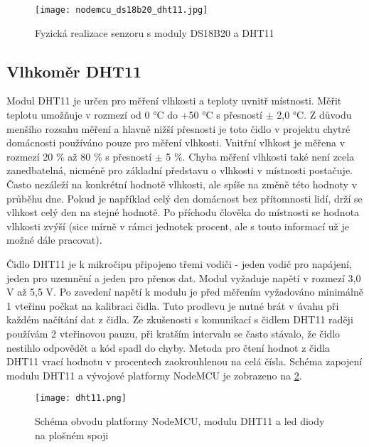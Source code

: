 \begin{figure}[H]
  \centering
  \texttt{[image: nodemcu\_ds18b20\_dht11.jpg]}
  \caption{Fyzická realizace senzoru s moduly DS18B20 a DHT11}
  \label{fig:nodemcu_ds18b20_dht11}
\end{figure} 

\subsection{Vlhkoměr DHT11} \label{subsec:dht11}

Modul DHT11 \cite{DHT11:Datasheet} je určen pro měření vlhkosti a teploty uvnitř místnosti. Měřit teplotu umožňuje v rozmezí od 0 \si{\degree}C do +50 \si{\degree}C s přesností $\pm$ 2,0 \si{\degree}C. Z důvodu menšího rozsahu měření a hlavně nižší přesnosti je toto čidlo v projektu chytré domácnosti používáno pouze pro měření vlhkosti. Vnitřní vlhkost je měřena v rozmezí 20 \% až 80 \% s přesností $\pm$ 5 \%. Chyba měření vlhkosti také není zcela zanedbatelná, nicméně pro základní představu o vlhkosti v místnosti postačuje. Často nezáleží na konkrétní hodnotě vlhkosti, ale spíše na změně této hodnoty v průběhu dne. Pokud je například celý den domácnost bez přítomnosti lidí, drží se vlhkost celý den na stejné hodnotě. Po příchodu člověka do místnosti se hodnota vlhkosti zvýší (sice mírně v rámci jednotek procent, ale s touto informací už je možné dále pracovat). \par
Čidlo DHT11 je k mikročipu připojeno třemi vodiči - jeden vodič pro napájení, jeden pro uzemnění a jeden pro přenos dat. Modul vyžaduje napětí v rozmezí 3,0 V až 5,5 V. Po zavedení napětí k modulu je před měřením vyžadováno minimálně 1 vteřinu počkat na kalibraci čidla. Tuto prodlevu je nutné brát v úvahu při každém načítání dat z čidla. Ze zkušenosti s komunikací s čidlem DHT11 raději používám 2 vteřinovou pauzu, při kratším intervalu se často stávalo, že čidlo nestihlo odpovědět a kód spadl do chyby. Metoda pro čtení hodnot z čidla DHT11 vrací hodnotu v procentech zaokrouhlenou na celá čísla. Schéma zapojení modulu DHT11 a vývojové platformy NodeMCU je zobrazeno na \cref{fig:schema_esp_dht11}. \par

\begin{figure}[H]
  \centering
  \texttt{[image: dht11.png]}
  \caption{Schéma obvodu platformy NodeMCU, modulu DHT11 a led diody na plošném spoji}
  \label{fig:schema_esp_dht11}
\end{figure}

